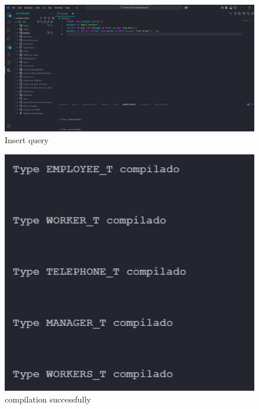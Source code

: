 \documentclass{article}
\begin{document}
\begin{figure}[H]
	\centering
	\includegraphics[width=1\textwidth]{imgs/inse4.jpeg}
	\caption{Insert query}
	\label{fig:12}
\end{figure}

\begin{figure}[H]
	\centering
	\includegraphics[width=1\textwidth]{imgs/comp.jpeg}
	\caption{compilation successfully}
	\label{fig:13}
\end{figure}
\end{document}
